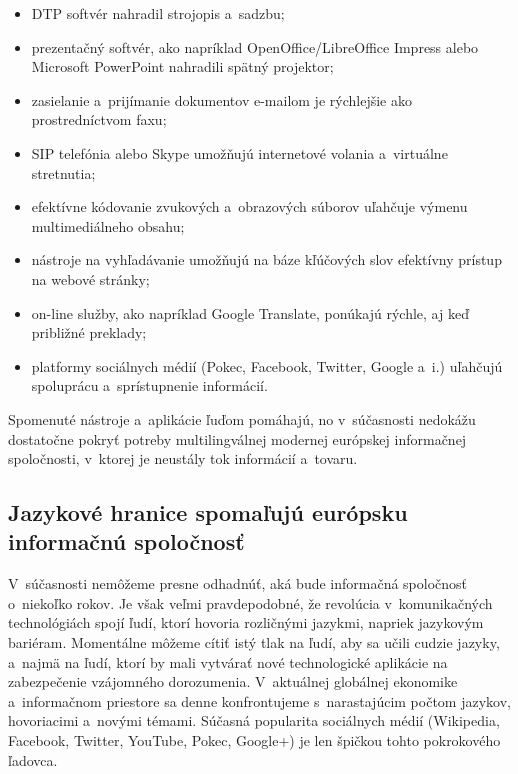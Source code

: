 \begin{multicols}{2}
\begin{itemize}
\item DTP softvér nahradil strojopis a~sadzbu;
\item prezentačný softvér, ako napríklad OpenOffice/LibreOffice Impress alebo Microsoft PowerPoint nahradili spätný projektor;
\item zasielanie a~prijímanie dokumentov e-mailom je rýchlejšie ako prostredníctvom faxu;
\item SIP telefónia alebo Skype umožňujú internetové volania a~virtuálne stretnutia;
\item efektívne kódovanie zvukových a~obrazových súborov uľahčuje výmenu multimediálneho obsahu;
\item nástroje na vyhľadávanie umožňujú na báze kľúčových slov efektívny prístup na webové stránky;
\item on-line služby, ako napríklad Google Translate, ponúkajú rýchle, aj keď približné preklady;
\item platformy sociálnych médií (Pokec, Facebook, Twitter, Google a~i.) uľahčujú spoluprácu a~sprístupnenie informácií.
\end{itemize}

Spomenuté nástroje a~aplikácie ľuďom pomáhajú, no v~súčasnosti nedokážu dostatočne pokryť potreby multilingválnej modernej európskej informačnej spoločnosti, v~ktorej je neustály tok informácií a~tovaru.

\subsection{Jazykové hranice spomaľujú európsku informačnú spoločnosť}
V~súčasnosti nemôžeme presne odhadnúť, aká bude informačná
spoločnosť o~niekoľko rokov. Je však veľmi pravdepodobné, že
revolúcia v~komunikačných technológiách spojí ľudí, ktorí
hovoria rozličnými jazykmi, napriek jazykovým bariéram. Momentálne
môžeme cítiť istý tlak na ľudí, aby sa učili cudzie jazyky,
a~najmä na ľudí, ktorí by mali vytvárať nové technologické
aplikácie na zabezpečenie vzájomného dorozumenia.
V~aktuálnej globálnej ekonomike a~informačnom priestore sa denne
konfrontujeme s~narastajúcim počtom jazykov, hovoriacimi a~novými
témami. Súčasná popularita sociálnych médií (Wikipedia, Facebook,
Twitter, YouTube, Pokec, Google+) je len špičkou tohto pokrokového
ľadovca.



\end{multicols}
